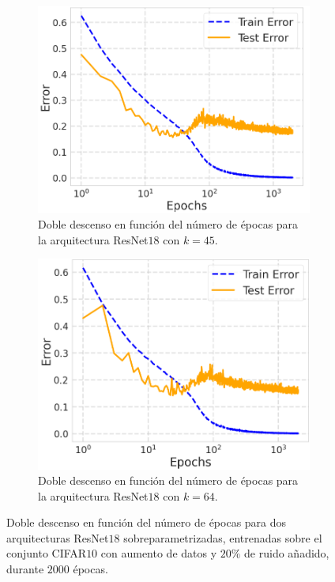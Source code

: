\begin{figure}[h]
    \centering
    \begin{subfigure}[b]{0.48\textwidth}
        \centering
        \includegraphics[width=\textwidth]{img/experiments/PreActResNet18(45).png}
        \caption{Doble descenso en función del número de épocas para la arquitectura ResNet$18$ con $k = 45$.}\label{fig:PreActResNet18(45)}
    \end{subfigure}
    \hfill
    \begin{subfigure}[b]{0.48\textwidth}
        \centering
        \includegraphics[width=\textwidth]{img/experiments/PreActResNet18(64).png}
        \caption{Doble descenso en función del número de épocas para la arquitectura ResNet$18$ con $k = 64$.}\label{fig:PreActResNet18(64)}
    \end{subfigure}
    \caption[Doble descenso en función del número de épocas para dos arquitecturas ResNet$18$ sobreparametrizadas y el conjunto CIFAR$10$.]{Doble descenso en función del número de épocas para dos arquitecturas ResNet$18$ sobreparametrizadas, entrenadas sobre el conjunto CIFAR$10$ con aumento de datos y $20\%$ de ruido añadido, durante $2000$ épocas.}\label{fig:epoch-wisePreActResNet18over}
\end{figure}

